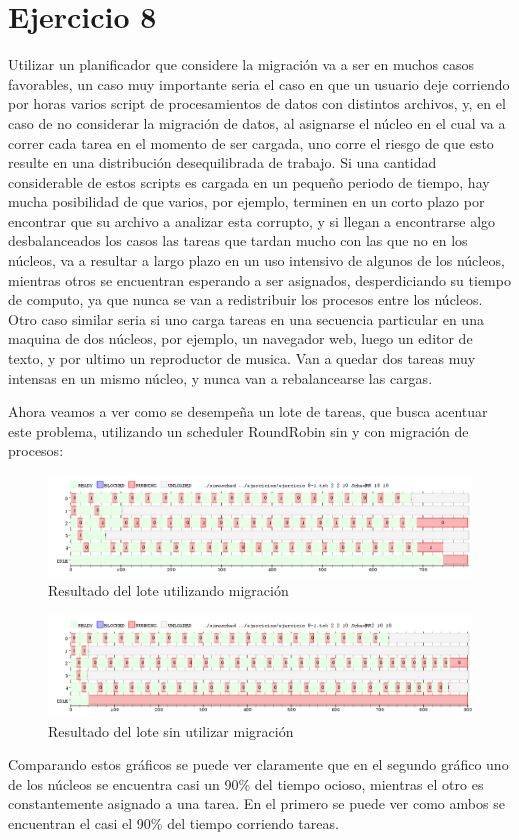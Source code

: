 \documentclass{article}
\begin{document}
\section{Ejercicio 8}

Utilizar un planificador que considere la migración va a ser en muchos casos favorables, un caso muy importante seria el caso en que un usuario deje corriendo por horas varios script de procesamientos de datos con distintos archivos, y, en el caso de no considerar la migración de datos, al asignarse el núcleo en el cual va a correr cada tarea en el momento de ser cargada, uno corre el riesgo de que esto resulte en una distribución desequilibrada de trabajo. Si una cantidad considerable de estos scripts es cargada en un pequeño periodo de tiempo, hay mucha posibilidad de que varios, por ejemplo, terminen en un corto plazo por encontrar que su archivo a analizar esta corrupto, y si llegan a encontrarse algo desbalanceados los casos las tareas que tardan mucho con las que no en los núcleos, va a resultar a largo plazo en un uso intensivo de algunos de los núcleos, mientras otros se encuentran esperando a ser asignados, desperdiciando su tiempo de computo, ya que nunca se van a redistribuir los procesos entre los núcleos. Otro caso similar seria si uno carga tareas en una secuencia particular en una maquina de dos núcleos, por ejemplo, un navegador web, luego un editor de texto, y por ultimo un reproductor de musica. Van a quedar dos tareas muy intensas en un mismo núcleo, y nunca van a rebalancearse las cargas.

Ahora veamos a ver como se desempeña un lote de tareas, que busca acentuar este problema, utilizando un scheduler RoundRobin sin y con migración de procesos:

\begin{figure}[h!]
\caption{Resultado del lote utilizando migración \label{grf:ex8-1m}}
\centering
\includegraphics[width=15cm]{../ejercicios/ejercicio 8-1RR}
\end{figure}

\begin{figure}[h!]
\caption{Resultado del lote sin utilizar migración \label{grf:ex8-1}}
\centering
\includegraphics[width=15cm]{../ejercicios/ejercicio 8-1}
\end{figure}

Comparando estos gráficos se puede ver claramente que en el segundo gráfico uno de los núcleos se encuentra casi un 90\% del tiempo ocioso, mientras el otro es constantemente asignado a una tarea. En el primero se puede ver como ambos se encuentran el casi el 90\% del tiempo corriendo tareas. 
\end{document}
